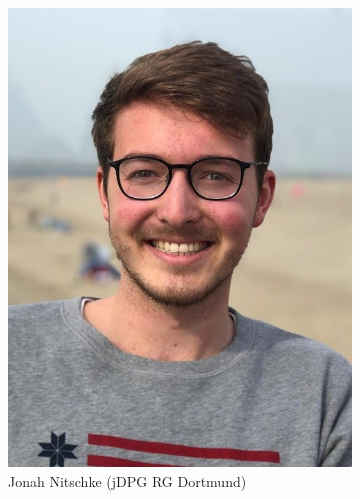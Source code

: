 \documentclass[compress, aspectratio=169]{beamer}
\begin{document}
\begin{frame}
\begin{figure}
\begin{subfigure}[t]{0.24\textwidth}
                \includegraphics[height=0.5\textheight]{Nitschke.jpeg}
                \caption*{Jonah Nitschke (jDPG RG Dortmund)}
        \end{subfigure}
                \begin{subfigure}[t]{0.24\textwidth}

\end{subfigure}
\end{figure}
\end{frame}
\end{document}
